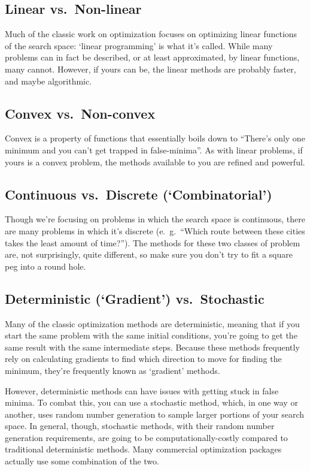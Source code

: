 \documentclass{article}
\begin{document}
  \subsection*{Linear vs.\ Non-linear}
		Much of the classic work on optimization focuses on optimizing
		linear functions of the search space: `linear programming' is
		what it's called. While many problems can in fact be described,
		or at least approximated, by linear functions, many cannot. However,
		if yours can be, the linear methods are probably faster, and maybe
		algorithmic.

  \subsection*{Convex vs.\ Non-convex}
		Convex is a property of functions that essentially boils down to 
		``There's only one minimum and you can't get trapped in false-minima''.
		As with linear problems, if yours is a convex problem, the methods
		available to you are refined and powerful.

  \subsection*{Continuous vs.\ Discrete (`Combinatorial')}
		Though we're focusing on problems in which the search space
		is continuous, there are many problems in which it's discrete
		(e.\ g.\ ``Which route between these cities takes the least
		amount of time?''). The methods for these two classes of 
		problem are, not surprisingly, quite different, so make sure you don't
		try to fit a square peg into a round hole. 

  \subsection*{Deterministic (`Gradient') vs.\ Stochastic}
		Many of the classic optimization methods are deterministic,
		meaning that if you start the same problem with the same initial
		conditions, you're going to get the same result with the same
		intermediate steps. Because these methods frequently rely
		on calculating gradients to find which direction to move
		for finding the minimum, they're frequently known as `gradient'
		methods. 

		However, deterministic methods can have issues with getting stuck
		in false minima. To combat this, you can use a stochastic method,
		which, in one way or another, uses random number generation to sample larger
		portions of your search space. In general, though, stochastic methods,
		with their random number generation requirements, are going to 
		be computationally-costly compared to traditional deterministic
		methods. Many commercial optimization packages actually use some
		combination of the two.
\end{document}
